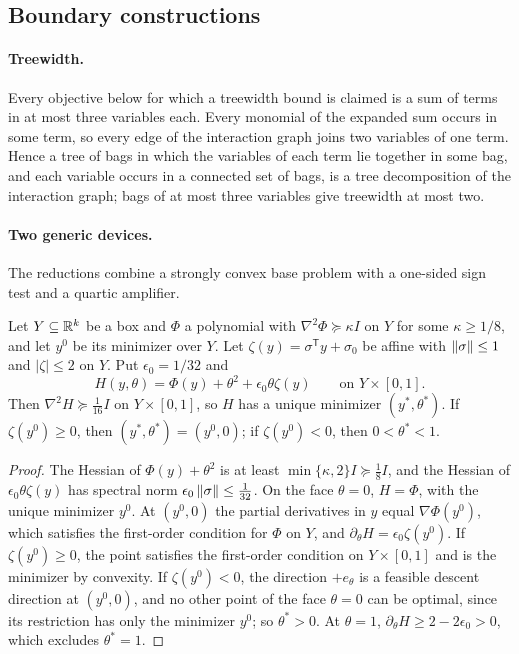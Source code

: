 \subsection{Boundary constructions}\label{app:points-boundary}

\paragraph{Treewidth.}
Every objective below for which a treewidth bound is claimed is a sum of
terms in at most three variables each. Every monomial of the expanded sum
occurs in some term, so every edge of the interaction graph joins two
variables of one term. Hence a tree of bags in which the variables of each
term lie together in some bag, and each variable occurs in a connected set of
bags, is a tree decomposition of the interaction graph; bags of at most three
variables give treewidth at most two.

\paragraph{Two generic devices.}
The reductions combine a strongly convex base problem with a one-sided
sign test and a quartic amplifier.

\begin{lemma}\label{lem:points-sign-test}
Let $Y\subseteq\mathbb R^k$ be a box and $\Phi$ a polynomial with
$\nabla^2\Phi\succeq\kappa I$ on $Y$ for some $\kappa\ge1/8$, and let $y^0$ be
its minimizer over $Y$. Let $\zeta(y)=\sigma^{\mathsf T}y+\sigma_0$ be affine
with $\left\lVert\sigma\right\rVert\le1$ and $|\zeta|\le2$ on $Y$. Put $\epsilon_0=1/32$ and
\[
 H(y,\theta)=\Phi(y)+\theta^2+\epsilon_0\theta\zeta(y)\qquad
 \text{on }Y\times[0,1].
\]
Then $\nabla^2H\succeq\tfrac1{16}I$ on $Y\times[0,1]$, so $H$ has a unique
minimizer $(y^*,\theta^*)$. If $\zeta(y^0)\ge0$, then $(y^*,\theta^*)=(y^0,0)$;
if $\zeta(y^0)<0$, then $0<\theta^*<1$.
\end{lemma}

\begin{proof}
The Hessian of $\Phi(y)+\theta^2$ is at least $\min\{\kappa,2\}I\succeq
\tfrac18I$, and the Hessian of $\epsilon_0\theta\zeta(y)$ has spectral norm
$\epsilon_0\left\lVert\sigma\right\rVert\le\tfrac1{32}$. On the face $\theta=0$, $H=\Phi$, with
the unique minimizer $y^0$. At $(y^0,0)$ the partial derivatives in $y$ equal
$\nabla\Phi(y^0)$, which satisfies the first-order condition for $\Phi$ on
$Y$, and $\partial_\theta H=\epsilon_0\zeta(y^0)$. If $\zeta(y^0)\ge0$, the
point satisfies the first-order condition on $Y\times[0,1]$ and is the
minimizer by convexity. If $\zeta(y^0)<0$, the direction $+e_\theta$ is a
feasible descent direction at $(y^0,0)$, and no other point of the face
$\theta=0$ can be optimal, since its restriction has only the minimizer
$y^0$; so $\theta^*>0$. At $\theta=1$,
$\partial_\theta H\ge2-2\epsilon_0>0$, which excludes $\theta^*=1$.
\end{proof}

